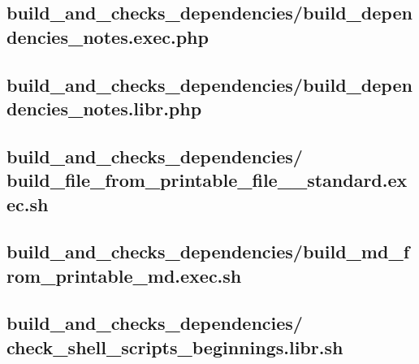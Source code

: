 \documentclass{article}
\begin{document}


\subsection{
  build\_and\_checks\_dependencies/build\_dependencies\_notes.exec.php
}
\label{
  build_and_checks_dependencies:build_dependencies_notesexecphp
}



\subsection{
  build\_and\_checks\_dependencies/build\_dependencies\_notes.libr.php
}
\label{
  build_and_checks_dependencies:build_dependencies_noteslibrphp
}



\subsection{
  build\_and\_checks\_dependencies/%
build\_file\_from\_printable\_file\_\_standard.exec.sh
}
\label{
  build_and_checks_dependencies:%
build_file_from_printable_file__standardexecsh
}



\subsection{
  build\_and\_checks\_dependencies/build\_md\_from\_printable\_md.exec.sh
}
\label{
  build_and_checks_dependencies:build_md_from_printable_mdexecsh
}



\subsection{
  build\_and\_checks\_dependencies/%
check\_shell\_scripts\_beginnings.libr.sh
}
\label{
  build_and_checks_dependencies:check_shell_scripts_beginningslibrsh
}
\end{document}
